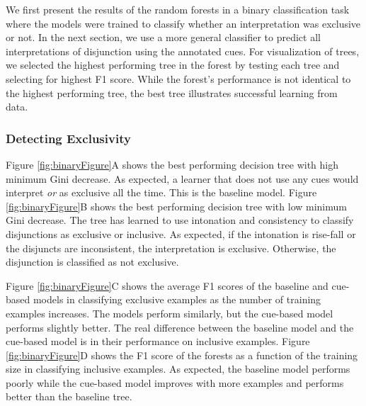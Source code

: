 \documentclass[
  ,man,floatsintext]{apa6}
\begin{document}
We first present the results of the random forests in a binary classification task where the models were trained to classify whether an interpretation was exclusive or not. In the next section, we use a more general classifier to predict all interpretations of disjunction using the annotated cues. For visualization of trees, we selected the highest performing tree in the forest by testing each tree and selecting for highest F1 score. While the forest's performance is not identical to the highest performing tree, the best tree illustrates successful learning from data.

\hypertarget{detecting-exclusivity}{%
\subsubsection{Detecting Exclusivity}\label{detecting-exclusivity}}

Figure \ref{fig:binaryFigure}A shows the best performing decision tree with high minimum Gini decrease. As expected, a learner that does not use any cues would interpret \emph{or} as exclusive all the time. This is the baseline model. Figure \ref{fig:binaryFigure}B shows the best performing decision tree with low minimum Gini decrease. The tree has learned to use intonation and consistency to classify disjunctions as exclusive or inclusive. As expected, if the intonation is rise-fall or the disjuncts are inconsistent, the interpretation is exclusive. Otherwise, the disjunction is classified as not exclusive.

Figure \ref{fig:binaryFigure}C shows the average F1 scores of the baseline and cue-based models in classifying exclusive examples as the number of training examples increases. The models perform similarly, but the cue-based model performs slightly better. The real difference between the baseline model and the cue-based model is in their performance on inclusive examples. Figure \ref{fig:binaryFigure}D shows the F1 score of the forests as a function of the training size in classifying inclusive examples. As expected, the baseline model performs poorly while the cue-based model improves with more examples and performs better than the baseline tree.
\end{document}
